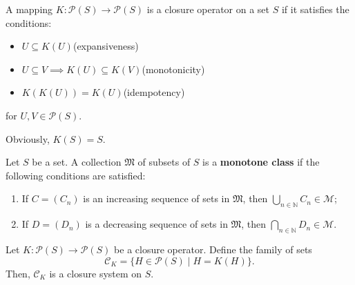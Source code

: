 \documentclass[../main.tex]{subfiles}
\begin{document}
\begin{purple}
\begin{definition}

A mapping $K:\mathcal{P}(S)\rightarrow\mathcal{P}(S)$ is a closure operator on a set $S$ if it satisfies the conditions:
\begin{itemize}
    \item $U\subseteq K(U)$(expansiveness)
    \item $U\subseteq V\implies K(U)\subseteq K(V)$(monotonicity)
    \item $K(K(U))=K(U)$(idempotency)
\end{itemize}
for $U,V\in\mathcal{P}(S)$.
\end{definition}
\end{purple}

Obviously, $K(S)=S$.

\begin{purple}
\begin{definition}
    Let $S$ be a set. A collection $\mathfrak{M}$ of subsets of $S$ is a \textbf{monotone class} if the following conditions are satisfied:
    \begin{enumerate}
        \item If $C = (C_n)$ is an increasing sequence of sets in $\mathfrak{M}$, then $\bigcup_{n \in \mathbb{N}} C_n \in \mathcal{M}$;
        
        \item If $D = (D_n)$ is a decreasing sequence of sets in $\mathfrak{M}$, then $\bigcap_{n \in \mathbb{N}} D_n \in \mathcal{M}$.
    \end{enumerate}
\end{definition}
\end{purple}

\begin{yellow}
\begin{theorem}

Let $K: \mathcal{P}(S) \to \mathcal{P}(S)$ be a closure operator. Define the family of sets 
$$
\mathcal{C}_K = \{H \in \mathcal{P}(S) \mid H = K(H)\}.
$$ 
Then, $\mathcal{C}_K$ is a closure system on $S$.

\end{theorem}
\end{yellow}
\end{document}
